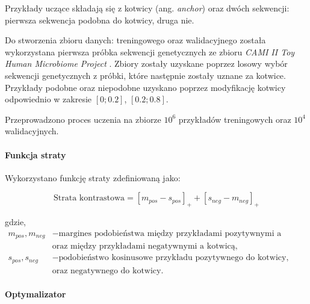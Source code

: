                     Przykłady uczące składają się z kotwicy (ang. \textit{anchor}) oraz dwóch sekwencji: pierwsza sekwencja podobna do kotwicy, druga nie.
    
                    Do stworzenia zbioru danych: treningowego oraz walidacyjnego została wykorzystana pierwsza próbka sekwencji genetycznych ze zbioru \textit{CAMI II Toy Human Microbiome Project} \cite{Fritz2019}. Zbiory zostały uzyskane poprzez losowy wybór sekwencji genetycznych z próbki, które następnie zostały uznane za kotwice. Przykłady podobne oraz niepodobne uzyskano poprzez modyfikację kotwicy odpowiednio w zakresie $[0; 0.2]$, $[0.2; 0.8]$.
    
    
                    Przeprowadzono proces uczenia na zbiorze $10^{6}$ przykładów treningowych oraz $10^{4}$ walidacyjnych.
    
                    \paragraph{Funkcja straty}
    
                        Wykorzystano funkcję straty zdefiniowaną jako:
                        
                        \begin{equation}
                            \text{Strata kontrastowa} = [m_{pos} - s_{pos}]_{+} + [s_{neg} - m_{neg}]_{+}
                        \end{equation}
    
                        gdzie,
                        \begin{align*}
                            m_{pos}, m_{neg} &- \text{margines podobieństwa między przykładami pozytywnymi a kotwicą,} \\
                            &\text{oraz między przykładami negatywnymi a kotwicą}, \\
                            s_{pos}, s_{neg} &- \text{podobieństwo kosinusowe przykładu pozytywnego do kotwicy,} \\
                            &\text{oraz negatywnego do kotwicy.}
                        \end{align*}
    
                    \paragraph{Optymalizator}
                    
